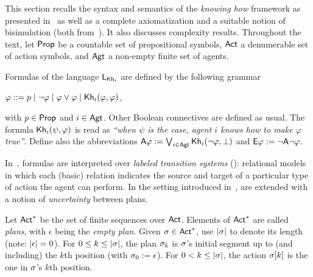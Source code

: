 This section recalls the syntax and semantics of the \emph{knowing how} framework as presented in~\cite{AFSVQ21} as well as a complete axiomatization and a suitable notion of bisimulation (both from~\cite{AFSVQ23report}). It also discusses complexity results. Throughout the text, let ${\rm \sf Prop}$ be a countable set of propositional symbols, ${\rm \sf Act}$ a denumerable set of action symbols, and ${\rm \sf Agt}$ a non-empty finite set of agents.

\medskip

\begin{definition}\label{def:khsyntax}
Formulas of the language $\mathsf{L}_{{\sf Kh}_i}$ are defined by the following grammar
\begin{spcenter}
  $\varphi ::= p \mid \neg\varphi \mid \varphi\vee\varphi \mid {\sf Kh}_i(\varphi,\varphi)$,
\end{spcenter}
with $p \in {\rm \sf Prop}$ and $i\in{\rm \sf Agt}$. Other Boolean connectives are defined as
usual. The formula ${\sf Kh}_i(\psi,\varphi)$ is read as
\emph{``when $\psi$ is the case, agent $i$ knows how to make
$\varphi$ true''}.
Define also the abbreviations ${\sf A}\varphi:=\bigvee_{i\in{\rm \sf Agt}} {\sf Kh}_i(\neg\varphi,\bot)$ and ${\sf E}\varphi:=\neg{\sf A}\neg\varphi$.
\end{definition}
\medskip

In~\cite{Wang15lori,Wang2016}, formulas are interpreted
over \emph{labeled transition systems} (\ltss): relational
models in which each (basic) relation indicates the source and target
of a particular type of action the agent can perform.
In the setting introduced in~\cite{AFSVQ21},  are extended with a notion of \emph{uncertainty} between plans.

\medskip

\begin{definition}
Let ${\rm \sf Act}^*$ be the set of finite sequences over ${\rm \sf Act}$. Elements of
${\rm \sf Act}^*$ are called \emph{plans}, with $\epsilon$ being the
\emph{empty plan}. %
Given $\sigma \in {\rm \sf Act}^*$, use $|{\sigma}|$ to denote its length (note: $|{\epsilon}| = 0$). For
$0 \le k \le |{\sigma}|$, the plan $\sigma_k$ is $\sigma$'s initial
segment up to (and including) the $k$th position (with
$\sigma_0 := \epsilon$). For $0 < k \le |{\sigma}|$, the action
$\sigma[k]$ is the one in $\sigma$'s $k$th position.
\end{definition}

